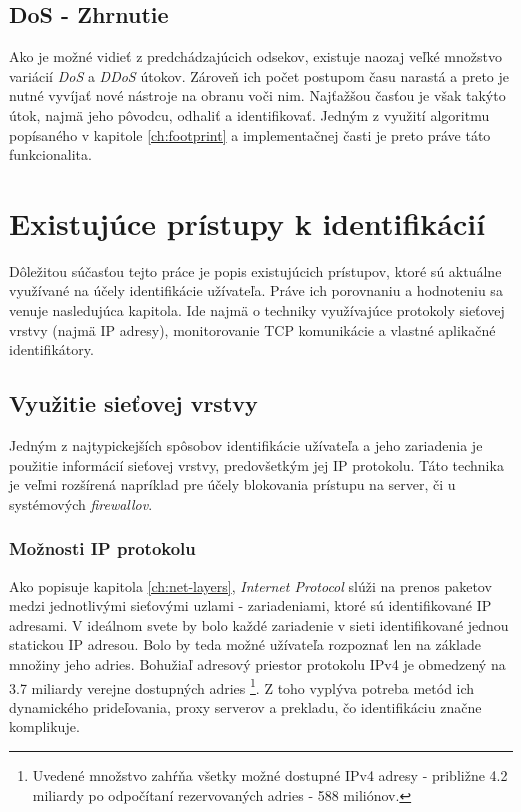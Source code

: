\documentclass[
  digital, %
  table,   %
  lof,     %
  nolot,   %
  nocover
]{fithesis3}
\begin{document}
\section{DoS - Zhrnutie}
Ako je možné vidieť z predchádzajúcich odsekov, existuje naozaj veľké množstvo
variácií \textit{DoS} a \textit{DDoS} útokov. Zároveň ich počet postupom času
narastá a preto je nutné vyvíjať nové nástroje na obranu voči nim. Najťažšou časťou
je však takýto útok, najmä jeho pôvodcu, odhaliť a identifikovať. Jedným z využití
algoritmu popísaného v kapitole \ref{ch:footprint} a implementačnej časti je preto
práve táto funkcionalita.

\chapter{Existujúce prístupy k identifikácií}
\label{ch:existing}
Dôležitou súčasťou tejto práce je popis existujúcich prístupov, ktoré
sú aktuálne využívané na účely identifikácie užívateľa. Práve ich porovnaniu
a hodnoteniu sa venuje nasledujúca kapitola.
Ide najmä o techniky využívajúce protokoly sieťovej vrstvy (najmä IP adresy),
monitorovanie TCP komunikácie a vlastné aplikačné identifikátory.

\section{Využitie sieťovej vrstvy}
Jedným z najtypickejších spôsobov identifikácie užívateľa a jeho zariadenia je
použitie informácií sieťovej vrstvy, predovšetkým jej IP protokolu.
Táto technika je veľmi rozšírená napríklad pre účely blokovania prístupu na
server, či u systémových \textit{firewallov}.

\subsection{Možnosti IP protokolu }
Ako popisuje kapitola \ref{ch:net-layers}, \textit{Internet Protocol} slúži na
prenos paketov medzi jednotlivými sieťovými uzlami - zariadeniami, ktoré sú
identifikované IP adresami. V ideálnom svete by bolo každé zariadenie v sieti
identifikované jednou statickou IP adresou. Bolo by teda možné užívateľa
rozpoznať len na základe množiny jeho adries. Bohužiaľ adresový priestor
protokolu IPv4 je obmedzený na 3.7 miliardy verejne dostupných adries
\footnote{
  Uvedené množstvo zahŕňa všetky možné dostupné IPv4 adresy - približne 4.2
  miliardy po odpočítaní rezervovaných adries - 588 miliónov.
}.
Z toho vyplýva potreba metód ich dynamického prideľovania, proxy serverov a
prekladu, čo identifikáciu značne komplikuje.
\end{document}
